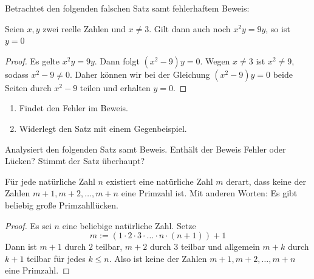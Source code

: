 \begin{aufg}[Fehlersuche I]
    Betrachtet den folgenden falschen Satz samt fehlerhaftem Beweis:
    \begin{satz}
        Seien $x,y$ zwei reelle Zahlen und $x\neq 3$. Gilt dann auch noch $x^2y=9y$, so ist $y=0$
    \end{satz}
    \begin{proof}\let\qed\relax
        Es gelte $x^2y=9y$. Dann folgt $(x^2-9)y=0$. Wegen $x\neq 3$ ist $x^2\neq 9$, sodass $x^2-9\neq 0$. Daher können wir bei der Gleichung $(x^2-9)y=0$ beide Seiten durch $x^2-9$ teilen und erhalten $y=0$.
    \end{proof}
    \begin{enumerate}
        \item Findet den Fehler im Beweis.
        \item Widerlegt den Satz mit einem Gegenbeispiel.
    \end{enumerate}
\end{aufg}


\begin{aufg}[Fehlersuche II]
    Analysiert den folgenden Satz samt Beweis. Enthält der Beweis Fehler oder Lücken? Stimmt der Satz überhaupt?
    \begin{satz}
        Für jede natürliche Zahl $n$ existiert eine natürliche Zahl $m$ derart, dass keine der Zahlen $m+1,m+2,\dots , m+n$ eine Primzahl ist. Mit anderen Worten: Es gibt beliebig große Primzahllücken.
    \end{satz}
    \begin{proof}
        Es sei $n$ eine beliebige natürliche Zahl. Setze 
            \[ m:= (1 \cdot 2 \cdot 3 \cdot \ldots \cdot n \cdot(n+1)) +1 \]
        Dann ist $m+1$ durch $2$ teilbar, $m+2$ durch $3$ teilbar und allgemein $m+k$ durch $k+1$ teilbar für jedes $k\le n$. Also ist keine der Zahlen $m+1,m+2,\dots , m+n$ eine Primzahl.
    \end{proof}
\end{aufg}


